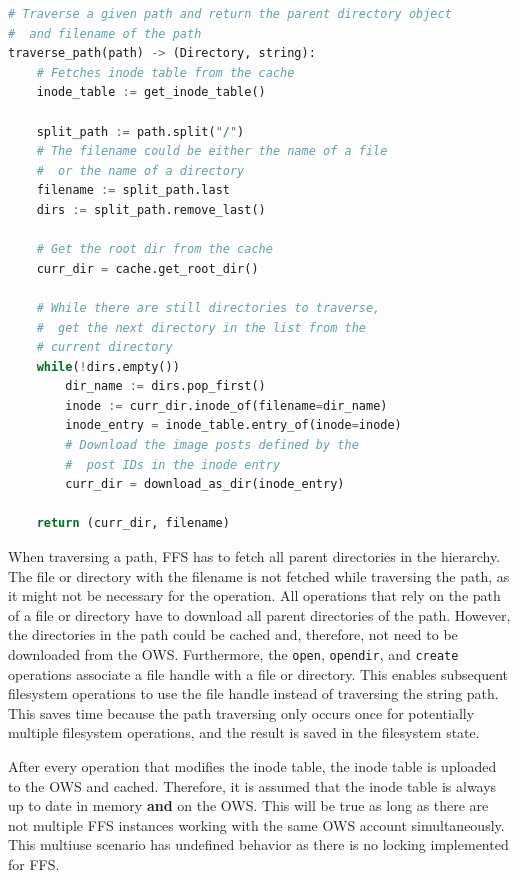 \begin{lstlisting}[language=python, caption={Pseudocode of traversing a given path, returning the \texttt{Directory} and the filename}, label=lst:traverse_path,breaklines=true, basicstyle=\footnotesize, float]
# Traverse a given path and return the parent directory object
#  and filename of the path
traverse_path(path) -> (Directory, string):
	# Fetches inode table from the cache
	inode_table := get_inode_table()
	
	split_path := path.split("/")
	# The filename could be either the name of a file 
	#  or the name of a directory
	filename := split_path.last
	dirs := split_path.remove_last()

	# Get the root dir from the cache
	curr_dir = cache.get_root_dir()

	# While there are still directories to traverse,
	#  get the next directory in the list from the 
	# current directory
	while(!dirs.empty())
		dir_name := dirs.pop_first()
		inode := curr_dir.inode_of(filename=dir_name)
		inode_entry = inode_table.entry_of(inode=inode)
		# Download the image posts defined by the 
		#  post IDs in the inode entry
		curr_dir = download_as_dir(inode_entry)
	
	return (curr_dir, filename)

\end{lstlisting}

When traversing a path, \gls{FFS} has to fetch all parent directories in the hierarchy. The file or directory with the filename is not fetched while traversing the path, as it might not be necessary for the operation. All operations that rely on the path of a file or directory have to download all parent directories of the path. However, the directories in the path could be cached and, therefore, not need to be downloaded from the \gls{OWS}. Furthermore, the \texttt{open}, \texttt{opendir}, and \texttt{create} operations associate a file handle with a file or directory. This enables subsequent filesystem operations to use the file handle instead of traversing the string path. This saves time because the path traversing only occurs once for potentially multiple filesystem operations, and the result is saved in the filesystem state.

After every operation that modifies the inode table, the inode table is uploaded to the \gls{OWS} and cached. Therefore, it is assumed that the inode table is always up to date in memory \textbf{and} on the \gls{OWS}. This will be true as long as there are not multiple \gls{FFS} instances working with the same \gls{OWS} account simultaneously. This multiuse scenario has undefined behavior as there is no locking implemented for \gls{FFS}.

